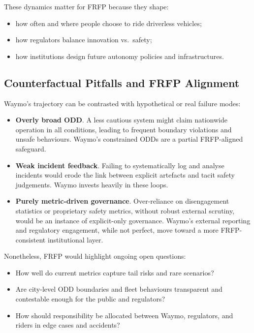These dynamics matter for FRFP because they shape:

\begin{itemize}
  \item how often and where people choose to ride driverless vehicles;
  \item how regulators balance innovation vs.\ safety;
  \item how institutions design future autonomy policies and infrastructures.
\end{itemize}

\subsection{Counterfactual Pitfalls and FRFP Alignment}

Waymo’s trajectory can be contrasted with hypothetical or real failure modes:

\begin{itemize}
  \item \textbf{Overly broad ODD}.
        A less cautious system might claim nationwide operation in all
        conditions, leading to frequent boundary violations and unsafe
        behaviours.
        Waymo’s constrained ODDs are a partial FRFP-aligned safeguard.
  \item \textbf{Weak incident feedback}.
        Failing to systematically log and analyse incidents would erode
        the link between explicit artefacts and tacit safety judgements.
        Waymo invests heavily in these loops.
  \item \textbf{Purely metric-driven governance}.
        Over-reliance on disengagement statistics or proprietary safety
        metrics, without robust external scrutiny, would be an instance of
        explicit-only governance.
        Waymo’s external reporting and regulatory engagement, while not
        perfect, move toward a more FRFP-consistent institutional layer.
\end{itemize}

Nonetheless, FRFP would highlight ongoing open questions:

\begin{itemize}
  \item How well do current metrics capture tail risks and rare scenarios?
  \item Are city-level ODD boundaries and fleet behaviours transparent and
        contestable enough for the public and regulators?
  \item How should responsibility be allocated between Waymo, regulators,
        and riders in edge cases and accidents?
\end{itemize}

